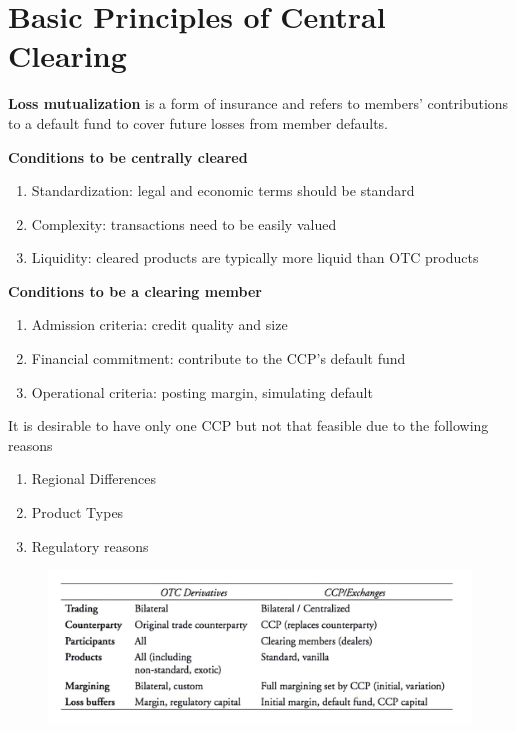 \documentclass[11pt,fleqn]{report} %
\numberwithin{equation}{section} %
\numberwithin{figure}{section} %
\numberwithin{table}{section} %
\begin{document}
\chapter{Basic Principles of Central Clearing}
 \begin{definition}\textbf{Loss mutualization} is a form of insurance and refers to members' contributions to a default fund to cover future losses from member defaults.
 
 \end{definition}
 \begin{definition}\textbf{Conditions to be centrally cleared}
    \begin{enumerate}
        \item Standardization: legal and economic terms should be standard
        \item Complexity: transactions need to be easily valued
        \item Liquidity: cleared products are typically more liquid than OTC products
    \end{enumerate}
 \end{definition}
 \begin{definition}\textbf{Conditions to be a clearing member}
    \begin{enumerate}
        \item Admission criteria: credit quality and size
        \item Financial commitment: contribute to the CCP's default fund
        \item Operational criteria: posting margin, simulating default
    \end{enumerate}
 \end{definition}
 \begin{remark}It is desirable to have only one CCP but not that feasible due to the following reasons
    \begin{enumerate}
        \item Regional Differences
        \item Product Types
        \item Regulatory reasons
    \end{enumerate}
 \end{remark}
 \begin{figure}[h!]
    \begin{center}
        \includegraphics[scale=0.7]{Central.png}
    \end{center}
 \end{figure}
\end{document}
